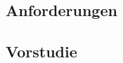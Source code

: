 \def \sectionauthors {Samuel Bleiner}
\subsection{Anforderungen}
\lipsum[1-5]
\subsection{Vorstudie}
\lipsum[1-5]